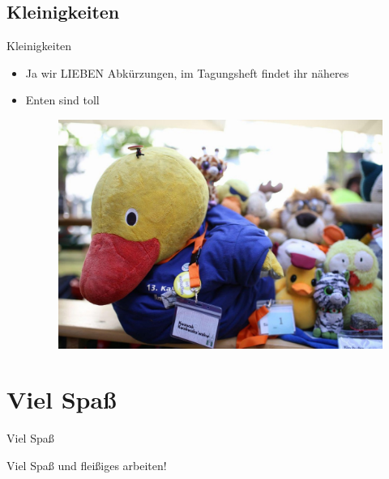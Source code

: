 \documentclass[compress,]{beamer}
\begin{document}

\subsection{Kleinigkeiten}

\begin{frame}{Kleinigkeiten}

\begin{itemize}
	\item<1-> Ja wir LIEBEN Abkürzungen, im Tagungsheft findet ihr näheres
	\item<2-> Enten sind toll
	\begin{figure}
		\centering
		\includegraphics[scale=0.1]{Ente.pdf}
	\end{figure}
	
\end{itemize}
\end{frame}

\section{Viel Spaß}

\begin{frame}{Viel Spaß}

Viel Spaß und fleißiges arbeiten!

\end{frame}
\end{document}
